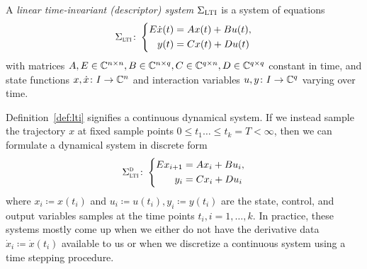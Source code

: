 \begin{definition}\label{def:lti}
    A \emph{linear time-invariant (descriptor) system} $\Sigma_{\textnormal{\scshape LTI}}$ is a system of equations
    \begin{equation}\label{eq:lti}
        \Sigma_{\textnormal{\scshape lti}} \colon \left\lbrace
        \begin{aligned}
            E \dot{x}(t) &= A x(t) + B u(t), \\
            y(t) &= C x(t) + D u(t)
        \end{aligned}
        \right.
    \end{equation}
    with matrices $A, E \in \mathbb{C}^{n \times n}, B \in \mathbb{C}^{n \times q}, C \in \mathbb{C}^{q \times n}, D \in \mathbb{C}^{q \times q}$ constant in time, and state functions $x, \dot{x} \colon I \to \mathbb{C}^n$ and interaction variables $u, y \colon I \to \mathbb{C}^q$ varying over time.
\end{definition}

\begin{remark}
    Definition~\ref{def:lti} signifies a continuous dynamical system.
    If we instead sample the trajectory $x$ at fixed sample points $0 \leq t_1 \dots \leq t_k = T < \infty$, then we can formulate a dynamical system in discrete form
    \begin{equation*}
        \Sigma_{\textnormal{\scshape lti}}^{\textnormal{\scshape d}} \colon \left\lbrace
        \begin{aligned}
            E x_{i + 1} &= A x_i + B u_i, \\
            y_i &= C x_i + D u_i
        \end{aligned}
        \right.
    \end{equation*}
    where $x_i \coloneqq x(t_i)$ and $u_i \coloneqq u(t_i), y_i \coloneqq y(t_i)$ are the state, control, and output variables samples at the time points $t_i, i = 1, \dots, k$.
    In practice, these systems mostly come up when we either do not have the derivative data $\dot{x}_i \coloneqq \dot{x}(t_i)$ available to us or when we discretize a continuous system using a time stepping procedure.
\end{remark}

